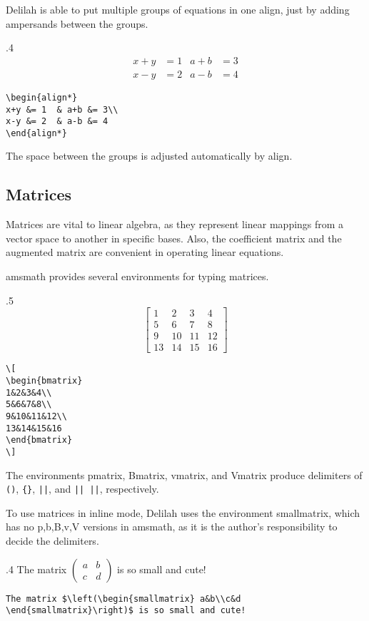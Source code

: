 Delilah is able to put multiple groups of equations in one align, just by adding ampersands between the groups.
\begin{miniexammar}{.4\textandmarginlen}{
\begin{align*}
x+y &= 1  & a+b &= 3\\
x-y &= 2  & a-b &= 4
\end{align*}
}
\begin{lstlisting}
\begin{align*}
x+y &= 1  & a+b &= 3\\
x-y &= 2  & a-b &= 4
\end{align*}
\end{lstlisting}
\end{miniexammar}
The space between the groups is adjusted automatically by align.

\subsection{Matrices}
Matrices are vital to linear algebra, as they represent linear mappings from a vector space to another in specific bases. Also, the coefficient matrix and the augmented matrix are convenient in operating linear equations.

amsmath provides several environments for typing matrices.
\begin{miniexammar}{.5\textandmarginlen}{
\[
\begin{bmatrix}
1&2&3&4\\
5&6&7&8\\
9&10&11&12\\
13&14&15&16
\end{bmatrix}
\]
}
\begin{lstlisting}
\[
\begin{bmatrix}
1&2&3&4\\
5&6&7&8\\
9&10&11&12\\
13&14&15&16
\end{bmatrix}
\]
\end{lstlisting}
\end{miniexammar}
The environments pmatrix, Bmatrix, vmatrix, and Vmatrix produce delimiters of \verb=()=, \verb={}=, \verb=||=, and \verb=|| ||=, respectively.

To use matrices in inline mode, Delilah uses the environment smallmatrix, which has no p,b,B,v,V versions in amsmath, as it is the author's responsibility to decide the delimiters.
\begin{miniexammar}{.4\textandmarginlen}{
The matrix $\left(\begin{smallmatrix} a&b\\c&d \end{smallmatrix}\right)$ is so small and cute!
}
\begin{lstlisting}
The matrix $\left(\begin{smallmatrix} a&b\\c&d \end{smallmatrix}\right)$ is so small and cute!
\end{lstlisting}
\end{miniexammar}


